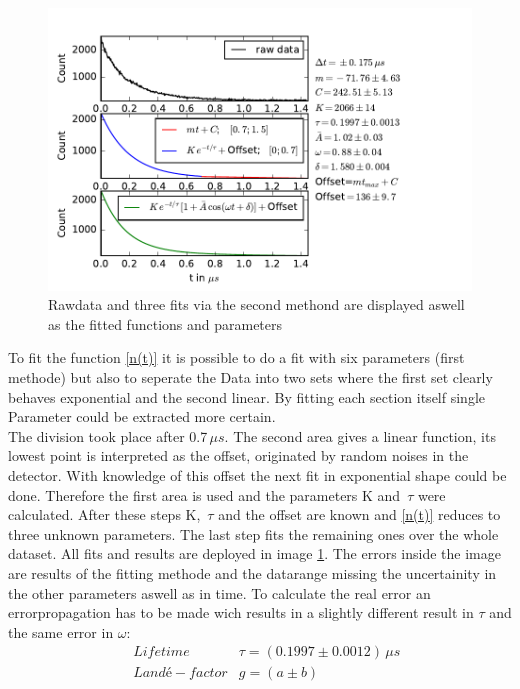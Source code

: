\documentclass{include/thesisclass3}
\newcommand{\e}[1]{\,\si{#1}}
\begin{document}
\begin{figure}[ht]
	\begin{center}
		\includegraphics[scale=1.2]{images/plot.pdf}
		\caption{Rawdata and three fits via the second methond are displayed aswell as the fitted functions and parameters}
		\label{method2}
	\end{center}
\end{figure}
To fit the function \ref{n(t)} it is possible to do a fit with six parameters (first methode) but also to seperate the Data into two sets where the first set clearly behaves exponential and the second linear. By fitting each section itself single Parameter could be extracted more certain. \\
The division took place after 0.7$\e{\mu s}$. The second area gives a linear function, its lowest point is interpreted as the offset, originated by random noises in the detector. With knowledge of this offset the next fit in exponential shape could be done. Therefore the first area is used and the parameters K and $\e{\tau}$ were calculated. After these steps K, $\e{\tau}$ and the offset are known and \ref{n(t)} reduces to three unknown parameters. The last step fits the remaining ones over the whole dataset. All fits and results are deployed in image \ref{method2}. The errors inside the image are results of the fitting methode and the datarange missing the uncertainity in the other parameters aswell as in time. To calculate the real error an errorpropagation has to be made wich results in a slightly different result in $\tau$ and the same error in $\omega$:
\begin{align}
&\e{Lifetime} &\tau=(0.1997\pm 0.0012)\e{\mu s}\\
&\e{Landé-factor} &g=(a\pm b)
\end{align}

\end{document}
